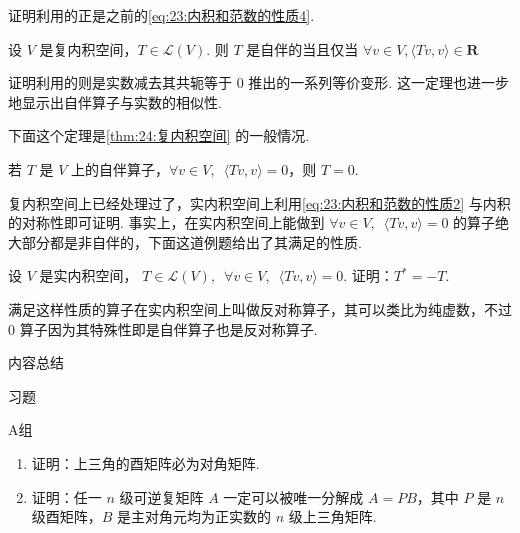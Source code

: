 证明利用的正是之前的\autoref{eq:23:内积和范数的性质4}.

\begin{theorem}
    设 $ V $ 是复内积空间，$ T \in \mathcal{L}(V) $. 则 $ T $ 是自伴的当且仅当 $ \forall v \in V, \langle Tv, v \rangle \in \mathbf{R} $
\end{theorem}

证明利用的则是实数减去其共轭等于 0 推出的一系列等价变形. 这一定理也进一步地显示出自伴算子与实数的相似性.

下面这个定理是\autoref{thm:24:复内积空间} 的一般情况.

\begin{theorem}
    若 $ T $ 是 $ V $ 上的自伴算子，$ \forall v \in V,\enspace \langle Tv, v \rangle = 0 $，则 $ T = 0 $.
\end{theorem}

复内积空间上已经处理过了，实内积空间上利用\autoref{eq:23:内积和范数的性质2} 与内积的对称性即可证明. 事实上，在实内积空间上能做到 $ \forall v \in V ,\enspace \langle Tv, v \rangle = 0 $ 的算子绝大部分都是非自伴的，下面这道例题给出了其满足的性质.

\begin{example}
    设 $ V $ 是实内积空间， $ T \in \mathcal{L}(V),\enspace \forall v \in V,\enspace \langle Tv, v \rangle = 0 $. 证明：$ T^* = -T $.
\end{example}

满足这样性质的算子在实内积空间上叫做反对称算子，其可以类比为纯虚数，不过 0 算子因为其特殊性即是自伴算子也是反对称算子.

\vspace{2ex}
\centerline{\heiti \Large 内容总结}

\vspace{2ex}
\centerline{\heiti \Large 习题}

\vspace{2ex}
{\kaishu }
\begin{flushright}
    \kaishu

\end{flushright}

\centerline{\heiti A组}
\begin{enumerate}
    \item 证明：上三角的酉矩阵必为对角矩阵.

    \item 证明：任一 $ n $ 级可逆复矩阵 $ A $ 一定可以被唯一分解成 $ A = PB $，其中 $ P $ 是 $ n $ 级酉矩阵，$ B $ 是主对角元均为正实数的 $ n $ 级上三角矩阵.
\end{enumerate}

